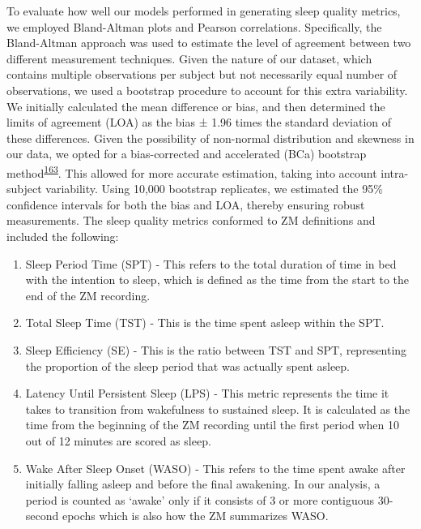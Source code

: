 \documentclass[
  10pt,
]{scrbook}
\providecommand{\tightlist}{%
  \setlength{\itemsep}{0pt}\setlength{\parskip}{0pt}}\usepackage{longtable,booktabs,array}
\begin{document}
To evaluate how well our models performed in generating sleep quality
metrics, we employed Bland-Altman plots and Pearson correlations.
Specifically, the Bland-Altman approach was used to estimate the level
of agreement between two different measurement techniques. Given the
nature of our dataset, which contains multiple observations per subject
but not necessarily equal number of observations, we used a bootstrap
procedure to account for this extra variability. We initially calculated
the mean difference or bias, and then determined the limits of agreement
(LOA) as the bias ± 1.96 times the standard deviation of these
differences. Given the possibility of non-normal distribution and
skewness in our data, we opted for a bias-corrected and accelerated
(BCa) bootstrap
method\textsuperscript{\protect\hyperlink{ref-diciccio_bootstrap_1996}{163}}.
This allowed for more accurate estimation, taking into account
intra-subject variability. Using 10,000 bootstrap replicates, we
estimated the 95\% confidence intervals for both the bias and LOA,
thereby ensuring robust measurements. The sleep quality metrics
conformed to ZM definitions and included the following:

\begin{enumerate}
\def\labelenumi{\arabic{enumi}.}
\tightlist
\item
  Sleep Period Time (SPT) - This refers to the total duration of time in
  bed with the intention to sleep, which is defined as the time from the
  start to the end of the ZM recording.
\item
  Total Sleep Time (TST) - This is the time spent asleep within the SPT.
\item
  Sleep Efficiency (SE) - This is the ratio between TST and SPT,
  representing the proportion of the sleep period that was actually
  spent asleep.
\item
  Latency Until Persistent Sleep (LPS) - This metric represents the time
  it takes to transition from wakefulness to sustained sleep. It is
  calculated as the time from the beginning of the ZM recording until
  the first period when 10 out of 12 minutes are scored as sleep.
\item
  Wake After Sleep Onset (WASO) - This refers to the time spent awake
  after initially falling asleep and before the final awakening. In our
  analysis, a period is counted as `awake' only if it consists of 3 or
  more contiguous 30-second epochs which is also how the ZM summarizes
  WASO.
\end{enumerate}
\end{document}
